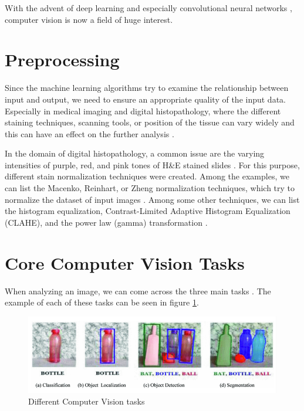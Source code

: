 With the advent of deep learning \cite{LeCun2015} and especially convolutional neural networks \cite{Ronneberger2015}, computer vision is now a field of huge interest.

\section{Preprocessing}
Since the machine learning algorithms try to examine the relationship between input and output, we need to ensure an appropriate quality of the input data. Especially in medical imaging and digital histopathology, where the different staining techniques, scanning tools, or position of the tissue can vary widely and this can have an effect on the further analysis \cite{Hoque2024}.

In the domain of digital histopathology, a common issue are the varying intensities of purple, red, and pink tones of H\&E stained slides \cite{Hoque2024}. For this purpose, different stain normalization techniques were created. Among the examples, we can list the Macenko, Reinhart, or Zheng normalization techniques, which try to normalize the dataset of input images \cite{Hoque2024}. Among some other techniques, we can list the histogram equalization, Contrast-Limited Adaptive Histogram Equalization (CLAHE), and the power law (gamma) transformation \cite{Dabass2020}.

\section{Core Computer Vision Tasks}
When analyzing an image, we can come across the three main tasks \cite{Alam2021}. The example of each of these tasks can be seen in figure \ref{fig:aiml-tasks}.

\begin{figure}[H]
\begin{centering}
\includegraphics[width=12cm]{assets/images/aiml-tasks.png}
\par\end{centering}
\caption{Different Computer Vision tasks \cite{Alam2021}}
\label{fig:aiml-tasks}
\end{figure}

